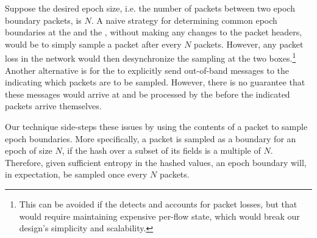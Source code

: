 Suppose the desired epoch size, i.e. the number of packets between two epoch boundary packets, is $N$. A naive strategy for determining common epoch boundaries at the \inbox and the \outbox, without making any changes to the packet headers, would be to simply sample a packet after every $N$ packets. However, any packet loss in the network would then desynchronize the sampling at the two boxes.\footnote{This can be avoided if the \outbox detects and accounts for packet losses, but that would require maintaining expensive per-flow state, which would break our design's simplicity and scalability.} Another alternative is for the \inbox to explicitly send out-of-band messages to the \outbox indicating which packets are to be sampled. However, there is no guarantee that these messages would arrive at and be processed by the \outbox before the indicated packets arrive themselves. 

Our technique side-steps these issues by using the contents of a packet to sample epoch boundaries. More specifically, a packet is sampled as a boundary for an epoch of size $N$, if the hash over a subset of its fields is a multiple of $N$. Therefore, given sufficient entropy in the hashed values, an epoch boundary will, in expectation, be sampled once every $N$ packets.

